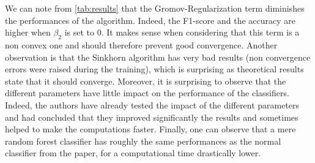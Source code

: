 \documentclass[a4paper,11pt]{article}
\begin{document}
We can note from \ref{tab:results} that the Gromov-Regularization term diminishes the performances of the algorithm. 
Indeed, the F1-score and the accuracy are higher when $\beta_2$ is set to 0.
It makes sense when considering that this term is a non convex one and should therefore prevent good convergence. 
Another observation is that the Sinkhorn algorithm has very bad results (non convergence errors were raised during the training), which is surprising as theoretical results state that it should converge. 
Moreover, it is surprising to observe that the different parameters have little impact on the performance of the classifiers. 
Indeed, the authors have already tested the impact of the different parameters and had concluded that they improved significantly the results and sometimes helped to make the computations faster. 
Finally, one can observe that a mere random forest classifier has roughly the same performances as the normal classifier from the paper, for a computational time drastically lower. 
\end{document}
